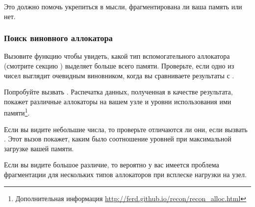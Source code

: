 Это должно помочь укрепиться в мысли, фрагментирована ли ваша память или нет.


\subsubsection{Поиск виновного аллокатора}

Вызовите функцию  чтобы увидеть, какой тип вспомогательного аллокатора (смотрите секцию ) выделяет больше всего памяти. Проверьте, если одно из чисел выглядит очевидным виновником, когда вы сравниваете результаты с .

Попробуйте вызвать . Распечатка данных, полученная в качестве результата, покажет различные аллокаторы на вашем узле и уровни использования ими памяти\footnote{Дополнительная информация \href{http://ferd.github.io/recon/recon\_alloc.html}{http://ferd.github.io/recon/recon\_alloc.html}}.

Если вы видите небольшие числа, то проверьте отличаются ли они, если вызвать . Этот вызов покажет, каким было соотношение уровней при максимальной загрузке вашей памяти.

Если вы видите большое различие, то вероятно у вас имеется проблема фрагментации для нескольких типов аллокаторов при всплеске нагрузки на узел.


